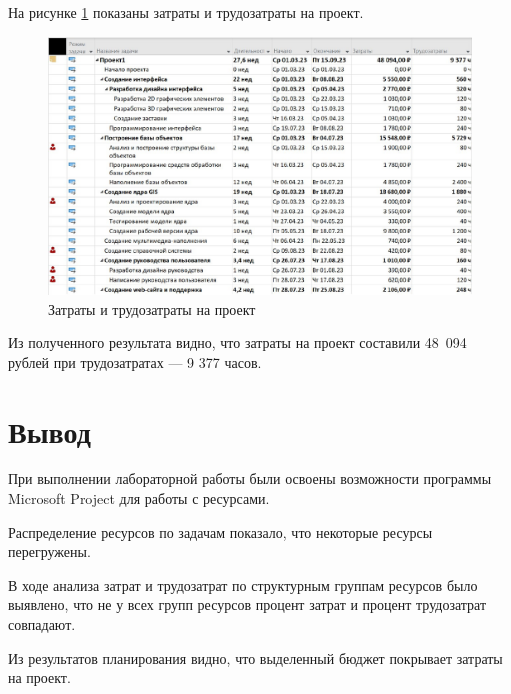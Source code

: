 На рисунке \ref{img:task3-budget} показаны затраты и трудозатраты на проект.

\begin{figure}[H]
	\begin{center}
		\includegraphics[scale=0.42]{inc/img/task3-budget.jpg}
	\end{center}
	\captionsetup{justification=centering}
	\caption{Затраты и трудозатраты на проект}
	\label{img:task3-budget}
\end{figure}

Из полученного результата видно, что затраты на проект составили 48~094 рублей при трудозатратах --- 9 377 часов.

\section*{Вывод}

При выполнении лабораторной работы были освоены возможности программы Microsoft Project для работы с ресурсами.

Распределение ресурсов по задачам показало, что некоторые ресурсы перегружены.

В ходе анализа затрат и трудозатрат по структурным группам ресурсов было выявлено, что не у всех групп ресурсов процент затрат и процент трудозатрат совпадают.

Из результатов планирования видно, что выделенный бюджет покрывает затраты на проект.